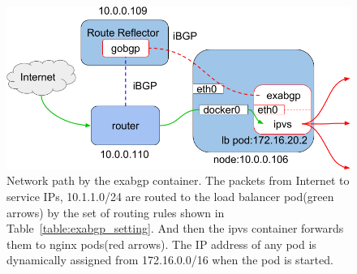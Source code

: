 \begin{figure}[tb]
  \centering
  \includegraphics[width=0.8\columnwidth]{Figs/exabgp}
  
  \par\bigskip
  \centering
  \begin{minipage}{0.9\columnwidth}
    \caption[Network path by the exabgp container]{
      Network path by the exabgp container.
      The packets from Internet to service IPs, 10.1.1.0/24 are routed to the load balancer pod(green arrows) by the set of routing rules shown in Table~\ref{table:exabgp_setting}.
      And then the ipvs container forwards them to nginx pods(red arrows).
      The IP address of any pod is dynamically assigned from 172.16.0.0/16 when the pod is started. 
    }
    \label{fig:exabgp_schem}
  \end{minipage}

\end{figure}

